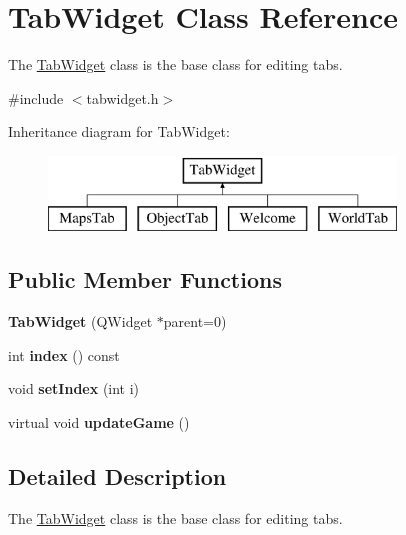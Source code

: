 \hypertarget{class_tab_widget}{\section{\-Tab\-Widget \-Class \-Reference}
\label{class_tab_widget}
}


\-The \hyperlink{class_tab_widget}{\-Tab\-Widget} class is the base class for editing tabs.  




{\ttfamily \#include $<$tabwidget.\-h$>$}

\-Inheritance diagram for \-Tab\-Widget\-:\begin{figure}[H]
\begin{center}
\leavevmode
\includegraphics[height=2.000000cm]{class_tab_widget}
\end{center}
\end{figure}
\subsection*{\-Public \-Member \-Functions}
\begin{DoxyCompactItemize}
\item 
\hypertarget{class_tab_widget_a5aad386a078e6085d72e5ade6c4a678d}{{\bfseries \-Tab\-Widget} (\-Q\-Widget $\ast$parent=0)}\label{class_tab_widget_a5aad386a078e6085d72e5ade6c4a678d}

\item 
\hypertarget{class_tab_widget_a98e3d1229d031db9584aee4e32f704ba}{int {\bfseries index} () const }\label{class_tab_widget_a98e3d1229d031db9584aee4e32f704ba}

\item 
\hypertarget{class_tab_widget_a39b94d30a678d6e9c93669888bfb8de3}{void {\bfseries set\-Index} (int i)}\label{class_tab_widget_a39b94d30a678d6e9c93669888bfb8de3}

\item 
\hypertarget{class_tab_widget_a2272e79554d0cb0aa69da95d7b4cc0b3}{virtual void {\bfseries update\-Game} ()}\label{class_tab_widget_a2272e79554d0cb0aa69da95d7b4cc0b3}

\end{DoxyCompactItemize}


\subsection{\-Detailed \-Description}
\-The \hyperlink{class_tab_widget}{\-Tab\-Widget} class is the base class for editing tabs. 

